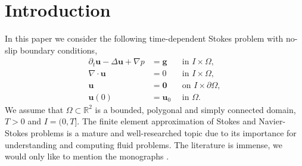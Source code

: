 \documentclass{m2an}
\newcommand{\1}{\mathds{1}}
\renewcommand{\u}{\mathbf{u}}
\newcommand{\oo}{\mathbf{0}}
\newcommand{\g}{\mathbf{g}}
\theoremstyle{definition}
\begin{document}
% 
% 
% 
% 
% 


\section{Introduction}

In this paper we consider the following time-dependent Stokes problem with no-slip boundary conditions, 
\begin{equation}\label{eq:transient:Stokes}
    \begin{aligned}
	\partial_t\u-\Delta \u+ \nabla p &= \g \quad &\text{in }I\times\Omega, \\
	\nabla \cdot \u &= 0 \quad &\text{in } I\times\Omega, \\
	\u &= \oo \quad  &\text{on } I\times\partial \Omega, \\
	\u(0) &= \u_0 &\text{in } \Omega.
    \end{aligned}
\end{equation}
We assume that $\Omega\subset \mathbb{R}^2$  is a bounded, polygonal and simply connected 
domain, $T>0$ and $I=(0,T]$.
%
The finite element approximation of Stokes and Navier-Stokes problems is a mature and well-researched topic due to its importance for understanding and computing fluid problems. The literature is immense, we would only like to mention the monographs \cite{Glowinski_2003, 1986Girault, temam_navier_stokes_2001}.  
\end{document}
